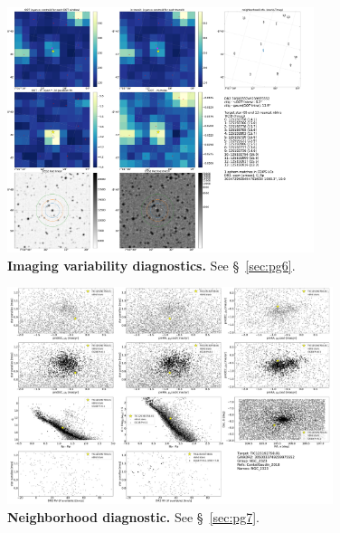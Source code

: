 \documentclass[12pt,twocolumn,tighten]{aastex62}
\begin{document}
\begin{figure}[!h]
	\begin{center}
		\leavevmode
		\includegraphics[width=0.8\textwidth]{pg_0006.pdf}
	\end{center}
	\vspace{-0.5cm}
	\caption{
		{\bf Imaging variability diagnostics.} See \S~\ref{sec:pg6}.
		\label{fig:pg6}
	}
\end{figure}

\begin{figure}[!h]
	\begin{center}
		\leavevmode
		\includegraphics[width=0.85\textwidth]{pg_0007.pdf}
	\end{center}
	\vspace{-0.5cm}
	\caption{
		{\bf Neighborhood diagnostic.} See \S~\ref{sec:pg7}.
		\label{fig:pg7}
	}
\end{figure}


\clearpage
\newpage
                            
 
\end{document}
